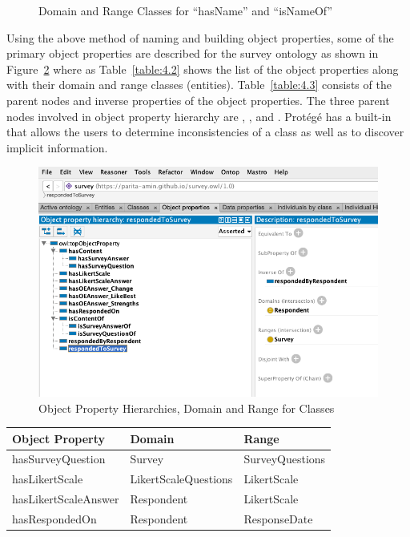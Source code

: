 \begin{doublespace}
\begin{figure}[htp]
    \caption{Domain and Range Classes for \enquote{hasName} and \enquote{isNameOf}}
    \label{fig:4.11}
\end{figure}
\par Using the above method of naming and building object properties, some of the primary object properties are described for the survey ontology as shown in Figure~\ref{fig:4.12} where as Table~\ref{table:4.2} shows the list of the object properties along with their domain and range classes (entities). Table~\ref{table:4.3} consists of the parent nodes and inverse properties of the object properties. The three parent nodes involved in object property hierarchy are , , and . Protégé has a built-in  that allows the users to determine inconsistencies of a class as well as to discover implicit information.
\begin{figure}[htp]
    \centering
    \includegraphics[width=15cm]{images/ch4/Figure12.png}
    \caption{Object Property Hierarchies, Domain and Range for Classes}
    \label{fig:4.12}
\end{figure}
\begin{table}[h!]
    \centering
    \begin{tabular}{|l|l|l|} 
    \hline Object Property & Domain & Range\\ \hline
     hasSurveyQuestion & Survey & SurveyQuestions\\ \hline
     hasLikertScale & LikertScaleQuestions & LikertScale\\ \hline
     hasLikertScaleAnswer & Respondent & LikertScale\\ \hline
     hasRespondedOn & Respondent & ResponseDate\\ \hline

\end{tabular}
\end{table}
\end{doublespace}
